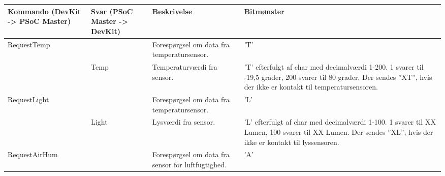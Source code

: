 \begin{longtable}{| p{3cm} | p{3cm} | p{3.2cm} | p{6cm} |}
    \hline
    Kommando \newline (DevKit -> PSoC Master)  & Svar \newline (PSoC Master -> DevKit)  & Beskrivelse                                         & Bitmønster                                                                                                                                                                                                                                    \\ \hline
    RequestTemp                       & ~                             & Forespørgsel om data fra temperatursensor.          & ’T’                                                                                                                                                                                                                                           \\ \hline
    ~                                 & Temp                          & Temperaturværdi fra sensor.                         & ’T’ efterfulgt af char med decimalværdi 1-200. 1 svarer til -19,5 grader, 200 svarer til 80 grader. Der sendes ”XT”, hvis der ikke er kontakt til temperatursensoren.                                                                       \\ \hline
    RequestLight                      & ~                             & Forespørgsel om data fra temperatursensor.          & ’L’                                                                                                                                                                                                                                            \\ \hline
    ~                                 & Light                         & Lysværdi fra sensor.                                & ’L’ efterfulgt af char med decimalværdi 1-100. 1 svarer til XX Lumen, 100 svarer til XX Lumen. Der sendes ”XL”, hvis der ikke er kontakt til lyssensoren.                                                                                   \\ \hline
    RequestAirHum                     & ~                             & Forespørgsel om data fra sensor for luftfugtighed.  & ’A’                                                                                                                                                                                                                                           \\ \hline

\end{longtable}
